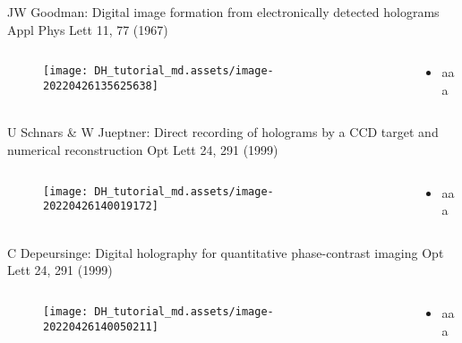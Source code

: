 \documentclass[t, aspectratio=169]{beamer}
\begin{document}
\begin{frame}{JW Goodman: Digital image formation from electronically detected holograms}
	\vspace{-3 mm}
	\small Appl Phys Lett 11, 77 (1967)
	\begin{columns}
		\begin{column}{.6\textwidth}
			\begin{figure}
				\texttt{[image: DH\_tutorial\_md.assets/image-20220426135625638]}
			\end{figure}
		\end{column}
		\begin{column}{.4\textwidth}
			\begin{itemize}
				\item aaa
			\end{itemize}
		\end{column}
	\end{columns}
\end{frame}


\begin{frame}{U Schnars \& W Jueptner: Direct recording of holograms by a CCD target and numerical reconstruction}
	\vspace{-3 mm}
	\small Opt Lett 24, 291 (1999)
	\begin{columns}
		\begin{column}{.6\textwidth}
			\begin{figure}
				\texttt{[image: DH\_tutorial\_md.assets/image-20220426140019172]}
			\end{figure}
		\end{column}
		\begin{column}{.4\textwidth}
			\begin{itemize}
				\item aaa
			\end{itemize}
		\end{column}
	\end{columns}
\end{frame}


\begin{frame}{C Depeursinge: Digital holography for quantitative phase-contrast imaging}
	\vspace{-3 mm}
	\small Opt Lett 24, 291 (1999)
	\begin{columns}
		\begin{column}{.6\textwidth}
			\begin{figure}
				\texttt{[image: DH\_tutorial\_md.assets/image-20220426140050211]}
			\end{figure}
		\end{column}
		\begin{column}{.4\textwidth}
			\begin{itemize}
				\item aaa
			\end{itemize}
		\end{column}
	\end{columns}
\end{frame}
\end{document}
